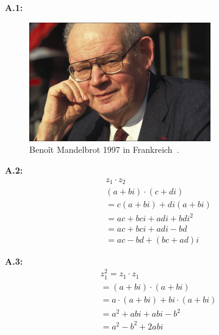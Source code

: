 \renewcommand{\thesection}{A}
\pagestyle{appendix}
\newcommand{\figuretag}[1]{%
  \addtocounter{figure}{-1}%
  \renewcommand{\thefigure}{#1}%
}

\noindent\textbf{A.1:}\label{app:1}
\begin{figure}[H]\figuretag{A.1}
\centering
\includegraphics[width=0.7\textwidth]{images/benoit-mandelbrot}
\caption{Benoît Mandelbrot 1997 in Frankreich~\cite{gaillarde_benoit_1997}.}
\label{fig:benoit-mandelbrot-picture}
\end{figure}

\noindent\textbf{A.2:}\label{app:2}
\begin{equation}\tag{A.2}\label{eq:complex-numbers-multiplication}
  \begin{split}
    z_1 \cdot z_2 \\
    (a + bi) \cdot (c + di) \\
    =  c(a + bi) + di(a + bi) \\
    = ac + bci + adi + bdi^2 \\
    = ac + bci + adi - bd \\
    = ac - bd +(bc + ad)i
  \end{split}
\end{equation}

\noindent\textbf{A.3:}\label{app:3}
\begin{equation}\tag{A.3}\label{eq:complex-numbes-squaring}
  \begin{split}
    z_1^2
    = z_1 \cdot z_1 \\
    = (a + bi) \cdot (a + bi) \\
    = a \cdot (a + bi) + bi \cdot (a + bi) \\
    = a^2 + abi + abi - b^2 \\
    = a^2 - b^2 + 2abi
  \end{split}
\end{equation}

